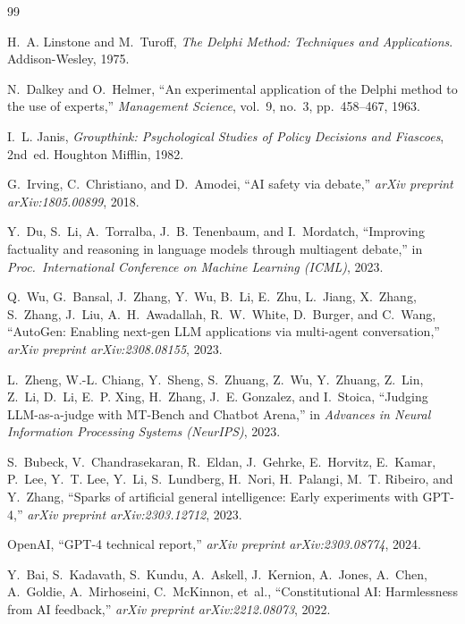 \documentclass[11pt,a4paper]{article}
\begin{document}
\begin{thebibliography}{99}

H.~A. Linstone and M.~Turoff, \emph{The Delphi Method: Techniques and Applications}. Addison-Wesley, 1975.

N.~Dalkey and O.~Helmer, ``An experimental application of the Delphi method to the use of experts,'' \emph{Management Science}, vol.~9, no.~3, pp.~458--467, 1963.

I.~L. Janis, \emph{Groupthink: Psychological Studies of Policy Decisions and Fiascoes}, 2nd~ed. Houghton Mifflin, 1982.

G.~Irving, C.~Christiano, and D.~Amodei, ``AI safety via debate,'' \emph{arXiv preprint arXiv:1805.00899}, 2018.

Y.~Du, S.~Li, A.~Torralba, J.~B. Tenenbaum, and I.~Mordatch, ``Improving factuality and reasoning in language models through multiagent debate,'' in \emph{Proc.\ International Conference on Machine Learning (ICML)}, 2023.

Q.~Wu, G.~Bansal, J.~Zhang, Y.~Wu, B.~Li, E.~Zhu, L.~Jiang, X.~Zhang, S.~Zhang, J.~Liu, A.~H.~Awadallah, R.~W.~White, D.~Burger, and C.~Wang, ``AutoGen: Enabling next-gen LLM applications via multi-agent conversation,'' \emph{arXiv preprint arXiv:2308.08155}, 2023.

L.~Zheng, W.-L. Chiang, Y.~Sheng, S.~Zhuang, Z.~Wu, Y.~Zhuang, Z.~Lin, Z.~Li, D.~Li, E.~P. Xing, H.~Zhang, J.~E. Gonzalez, and I.~Stoica, ``Judging LLM-as-a-judge with MT-Bench and Chatbot Arena,'' in \emph{Advances in Neural Information Processing Systems (NeurIPS)}, 2023.

S.~Bubeck, V.~Chandrasekaran, R.~Eldan, J.~Gehrke, E.~Horvitz, E.~Kamar, P.~Lee, Y.~T. Lee, Y.~Li, S.~Lundberg, H.~Nori, H.~Palangi, M.~T. Ribeiro, and Y.~Zhang, ``Sparks of artificial general intelligence: Early experiments with GPT-4,'' \emph{arXiv preprint arXiv:2303.12712}, 2023.

OpenAI, ``GPT-4 technical report,'' \emph{arXiv preprint arXiv:2303.08774}, 2024.

Y.~Bai, S.~Kadavath, S.~Kundu, A.~Askell, J.~Kernion, A.~Jones, A.~Chen, A.~Goldie, A.~Mirhoseini, C.~McKinnon, et~al., ``Constitutional AI: Harmlessness from AI feedback,'' \emph{arXiv preprint arXiv:2212.08073}, 2022.


\end{thebibliography}
\end{document}
